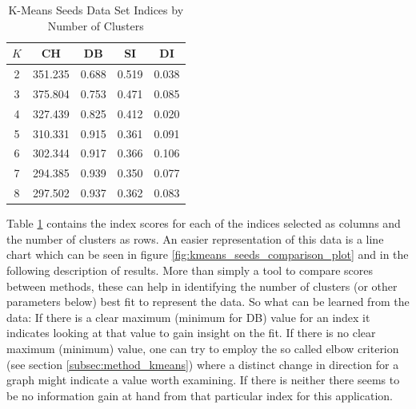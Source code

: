 \begin{table}[H]
\begin{center}
\begin{tabular}{crrrr}
$K$ & \multicolumn{1}{c}{\gls{CH}} & \multicolumn{1}{c}{\gls{DB}} & \multicolumn{1}{c}{\gls{SI}} & \multicolumn{1}{c}{\gls{DI}} \\ \hline
2 & 351.235 & 0.688 & 0.519 & 0.038 \\
3 & 375.804 & 0.753 & 0.471 & 0.085 \\
4 & 327.439 & 0.825 & 0.412 & 0.020 \\
5 & 310.331 & 0.915 & 0.361 & 0.091 \\
6 & 302.344 & 0.917 & 0.366 & 0.106 \\
7 & 294.385 & 0.939 & 0.350 & 0.077 \\
8 & 297.502 & 0.937 & 0.362 & 0.083 \\
\end{tabular}%
\end{center}
\caption{K-Means Seeds Data Set Indices by Number of Clusters}
\label{tab:kmeans_seeds_table}
\end{table}

Table \ref{tab:kmeans_seeds_table} contains the index scores for each of the indices selected as columns and the number of clusters as rows. An easier representation of this data is a line chart which can be seen in figure \ref{fig:kmeans_seeds_comparison_plot} and in the following description of results. More than simply a tool to compare scores between methods, these can help in identifying the number of clusters (or other parameters below) best fit to represent the data. So what can be learned from the data: If there is a clear maximum (minimum for \gls{DB}) value for an index it indicates looking at that value to gain insight on the fit. If there is no clear maximum (minimum) value, one can try to employ the so called elbow criterion (see section \ref{subsec:method_kmeans}) where a distinct change in direction for a graph might indicate a value worth examining. If there is neither there seems to be no information gain at hand from that particular index for this application.

